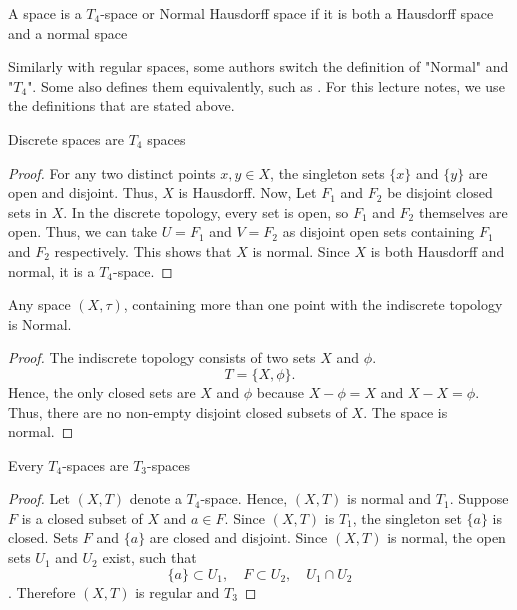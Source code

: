 \documentclass[12pt]{article} %
\begin{document}
\begin{definition}
A space is a $T_4$-space or Normal Hausdorff space if it is both a Hausdorff space and a normal space
\end{definition}

Similarly with regular spaces, some authors switch the definition of "Normal" and "$T_4$". Some also defines them equivalently, such as \textcite{Dugundji1966}. For this lecture notes, we use the definitions that are stated above.

\begin{example}
    Discrete spaces are $T_4$ spaces
\end{example}
\begin{proof}
For any two distinct points $x,y \in X$, the singleton sets $\{x\}$ and $\{y\}$ are open and disjoint. Thus, $X$ is Hausdorff. Now, Let $F_1$ and $F_2$ be disjoint closed sets in $X$. In the discrete topology, every set is open, so $F_1$ and $F_2$ themselves are open. Thus, we can take $U=F_1$ and $V=F_2$ as disjoint open sets containing $F_1$ and $F_2$ respectively. This shows that $X$ is normal. Since $X$ is both Hausdorff and normal, it is a $T_4$-space.    
\end{proof}

\begin{example}
    Any space $(X,\tau)$, containing more than one point with the indiscrete topology is Normal.
\end{example}

\begin{proof}
    The indiscrete topology consists of two sets $X$ and $\phi$.
\[ T = \{X, \phi\}. \]
Hence, the only closed sets are $X$ and $\phi$ because $X - \phi = X$ and $X - X = \phi$.
Thus, there are no non-empty disjoint closed subsets of $X$. The space is normal.
\end{proof}

\begin{theorem}
    Every $T_4$-spaces are $T_3$-spaces
\end{theorem}
\begin{proof}
Let $(X,T)$ denote a $T_4$-space. Hence, $(X,T)$ is normal and $T_1$. Suppose $F$ is a closed subset of $X$ and $a\in F$. Since $(X,T)$ is $T_1$, the singleton set $\{a\}$ is closed. Sets $F$ and $\{a\}$ are closed and disjoint. Since $(X,T)$ is normal, the open sets $U_1$ and $U_2$ exist, such that
$$\{a\} \subset U_1, \quad F\subset U_2, \quad U_1\cap U_2$$.
Therefore $(X,T)$ is regular and $T_3$
\end{proof}
\end{document}
